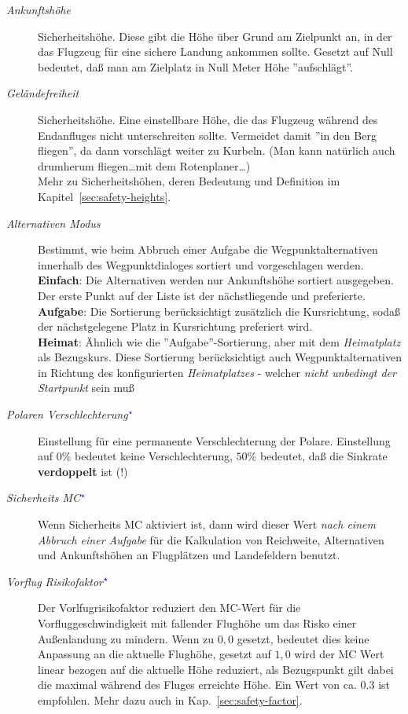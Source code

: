 \begin{description}
\item[\textit{Ankunftshöhe}] Sicherheitshöhe.  Diese  gibt die Höhe über Grund am Zielpunkt an, in der das
Flugzeug für eine sichere Landung ankommen sollte. Gesetzt auf Null bedeutet, daß man am Zielplatz in Null Meter Höhe ''aufschlägt''.
\item[\textit{Geländefreiheit}]  \label{conf:safetyterrain} Sicherheitshöhe. Eine einstellbare Höhe, die das Flugzeug während des Endanfluges
nicht unterschreiten sollte. Vermeidet damit ''in den Berg fliegen'', da \xc dann vorschlägt weiter zu Kurbeln. (Man kann natürlich auch
drumherum fliegen\dots mit dem Rotenplaner\dots)\\
Mehr zu Sicherheitshöhen, deren Bedeutung und Definition  im Kapitel~\ref{sec:safety-heights}.
\item[\textit{Alternativen Modus}]  \label{conf:alternatesmode} Bestimmt, wie beim Abbruch einer Aufgabe die Wegpunktalternativen
innerhalb des Wegpunktdialoges sortiert und vorgeschlagen werden. \\
{\bf Einfach}: Die Alternativen werden nur Ankunftshöhe sortiert ausgegeben. Der erste Punkt auf der Liste ist der nächstliegende
und preferierte.\\
{\bf Aufgabe}: Die Sortierung berücksichtigt  zusätzlich die Kursrichtung, sodaß der nächstgelegene Platz in Kursrichtung
preferiert wird. \\
{\bf Heimat}:  Ähnlich wie die ''Aufgabe''-Sortierung, aber  mit dem \textsl{Heimatplatz} als Bezugskurs.   Diese Sortierung berücksichtigt
auch Wegpunktalternativen in Richtung des konfigurierten \textsl{Heimatplatzes}  - welcher \textsl{nicht unbedingt der Startpunkt} sein muß \achtung
\item[\textit{Polaren Verschlechterung$^{\textcolor{blue}{\star}}$}] Einstellung für eine permanente Verschlechterung der Polare. Einstellung auf $0 \% $ bedeutet keine Verschlechterung,
$50 \% $ bedeutet, daß die Sinkrate \textbf{verdoppelt} ist (!)
\item[\textit{Sicherheits MC$^{\textcolor{blue}{\star}}$}]  Wenn Sicherheits MC aktiviert ist, dann wird dieser Wert \textit{nach einem Abbruch einer Aufgabe} für die Kalkulation von Reichweite, Alternativen und Ankunftshöhen an Flugplätzen und Landefeldern benutzt.\label{safety-MC} 

\item[\textit{Vorflug Risikofaktor$^{\textcolor{blue}{\star}}$}]
 Der Vorlfugrisikofaktor reduziert den MC-Wert für die Vorfluggeschwindigkeit mit fallender Flughöhe um das Risko einer
 Außenlandung zu mindern. Wenn zu $0,0$ gesetzt, bedeutet dies keine Anpassung an die aktuelle Flughöhe, gesetzt auf $1,0$
wird der MC Wert linear bezogen auf die aktuelle Höhe reduziert, als Bezugspunkt gilt dabei die maximal während des
Fluges erreichte Höhe.
Ein Wert von ca. $0.3$ ist empfohlen.  Mehr dazu auch in Kap.~\ref{sec:safety-factor}.
\end{description}


